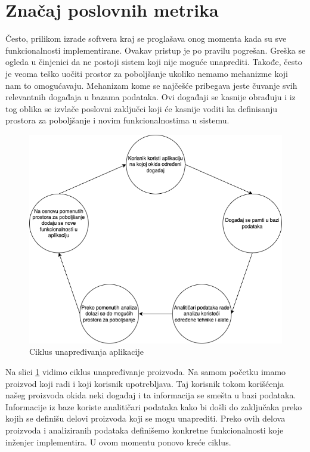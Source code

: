 \documentclass[12pt,oneside]{memoir}
\begin{document}
\section{Značaj poslovnih metrika}

Često, prilikom izrade softvera kraj se proglašava onog momenta kada su sve funkcionalnosti implementirane. Ovakav pristup je po pravilu pogrešan. Greška se ogleda u činjenici da ne postoji sistem koji nije moguće unaprediti. Takođe, često je veoma teško uočiti prostor za poboljšanje ukoliko nemamo mehanizme koji nam to omogućavaju. Mehanizam kome se najčešće pribegava jeste čuvanje svih relevantnih događaja u bazama podataka\cite{dataAnalytics}. Ovi događaji se kasnije obrađuju i iz tog oblika se izvlače poslovni zaključci koji će kasnije voditi ka definisanju prostora za poboljšanje i novim funkcionalnostima u sistemu.

\begin{figure}[h!]
\centering
\includegraphics[scale=0.5]{docs/images/chapterSix/dataFlow.png}
\caption{Ciklus unapređivanja aplikacije}
\label{fig:dataFlow}
\end{figure}

Na slici \ref{fig:dataFlow} vidimo ciklus unapređivanje proizvoda. Na samom početku imamo proizvod koji radi i koji korisnik upotrebljava. Taj korisnik tokom korišćenja našeg proizvoda okida neki događaj i ta informacija se smešta u bazi podataka. Informacije iz baze koriste analitičari podataka kako bi došli do zaključaka preko kojih se definišu delovi proizvoda koji se mogu unaprediti. Preko ovih delova proizvoda i analiziranih podataka definišemo konkretne funkcionalnosti koje inženjer implementira. U ovom momentu ponovo kreće ciklus.
\end{document}
